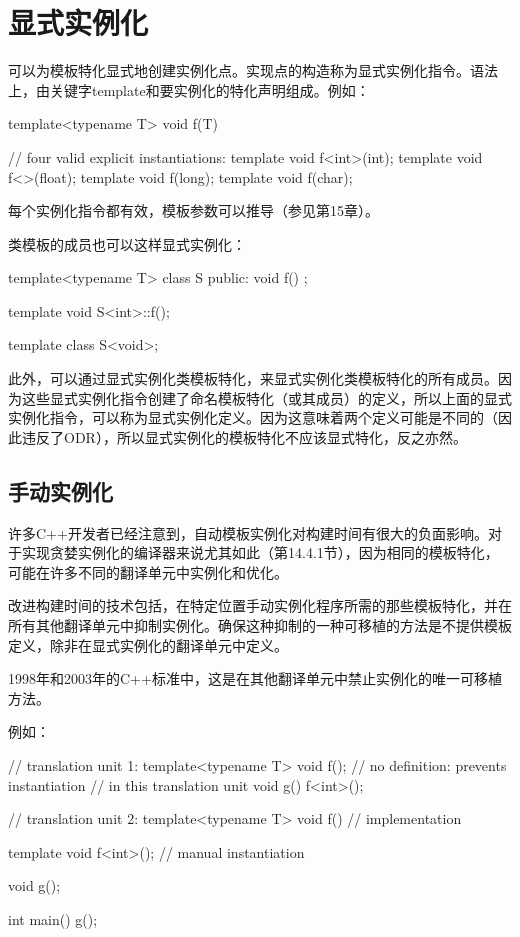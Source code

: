 \section{显式实例化}

可以为模板特化显式地创建实例化点。实现点的构造称为显式实例化指令。语法上，由关键字template和要实例化的特化声明组成。例如：

\begin{cpp}
template<typename T>
void f(T) { }

// four valid explicit instantiations:
template void f<int>(int);
template void f<>(float);
template void f(long);
template void f(char);
\end{cpp}

每个实例化指令都有效，模板参数可以推导（参见第15章）。

类模板的成员也可以这样显式实例化：

\begin{cpp}
template<typename T>
class S {
	public:
	void f() {
	}
};

template void S<int>::f();

template class S<void>;
\end{cpp}

此外，可以通过显式实例化类模板特化，来显式实例化类模板特化的所有成员。因为这些显式实例化指令创建了命名模板特化（或其成员）的定义，所以上面的显式实例化指令，可以称为显式实例化定义。因为这意味着两个定义可能是不同的（因此违反了ODR），所以显式实例化的模板特化不应该显式特化，反之亦然。

\subsection{手动实例化}

许多C++开发者已经注意到，自动模板实例化对构建时间有很大的负面影响。对于实现贪婪实例化的编译器来说尤其如此（第14.4.1节），因为相同的模板特化，可能在许多不同的翻译单元中实例化和优化。

改进构建时间的技术包括，在特定位置手动实例化程序所需的那些模板特化，并在所有其他翻译单元中抑制实例化。确保这种抑制的一种可移植的方法是不提供模板定义，除非在显式实例化的翻译单元中定义。

\begin{notice}
1998年和2003年的C++标准中，这是在其他翻译单元中禁止实例化的唯一可移植方法。
\end{notice}

例如：

\begin{cpp}
// translation unit 1:
template<typename T> void f(); // no definition: prevents instantiation
								// in this translation unit
void g() {
	f<int>();
}

// translation unit 2:
template<typename T> void f() {
	// implementation
}

template void f<int>(); // manual instantiation

void g();

int main() {
	g();
}
\end{cpp}

